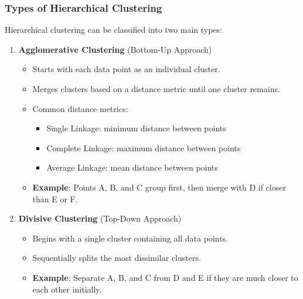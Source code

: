 \documentclass[aspectratio=169]{beamer}
\begin{document}
\begin{frame}[fragile]
    \frametitle{Types of Hierarchical Clustering}
    Hierarchical clustering can be classified into two main types:
    \begin{enumerate}
        \item \textbf{Agglomerative Clustering} (Bottom-Up Approach)
            \begin{itemize}
                \item Starts with each data point as an individual cluster.
                \item Merges clusters based on a distance metric until one cluster remains.
                \item Common distance metrics:
                    \begin{itemize}
                        \item Single Linkage: minimum distance between points
                        \item Complete Linkage: maximum distance between points
                        \item Average Linkage: mean distance between points
                    \end{itemize}
                \item \textbf{Example}: Points A, B, and C group first, then merge with D if closer than E or F.
            \end{itemize}
        
        \item \textbf{Divisive Clustering} (Top-Down Approach)
            \begin{itemize}
                \item Begins with a single cluster containing all data points.
                \item Sequentially splits the most dissimilar clusters.
                \item \textbf{Example}: Separate A, B, and C from D and E if they are much closer to each other initially.
            \end{itemize}
    \end{enumerate}
\end{frame}
\end{document}

